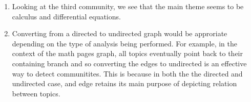 \documentclass{article}
\begin{document}
\begin{enumerate}[label=(\alph*), left=10pt, itemsep=10pt]
        \item \begin{minipage}[t]{0.9\textwidth}
            Looking at the third community, we see that the main theme seems to be calculus
            and differential equations.
        \end{minipage}

        \item \begin{minipage}[t]{0.9\textwidth}
            Converting from a directed to undirected graph would be approriate depending on the
            type of analysis being performed. For example, in the context of the math pages graph,
            all topics eventually point back to their containing branch and so converting the edges
            to undirected is an effective way to detect communitites. This is because in both the
            the directed and undirected case, and edge retains its main purpose of depicting
            relation between topics.
        \end{minipage}

    \end{enumerate}
\end{document}

